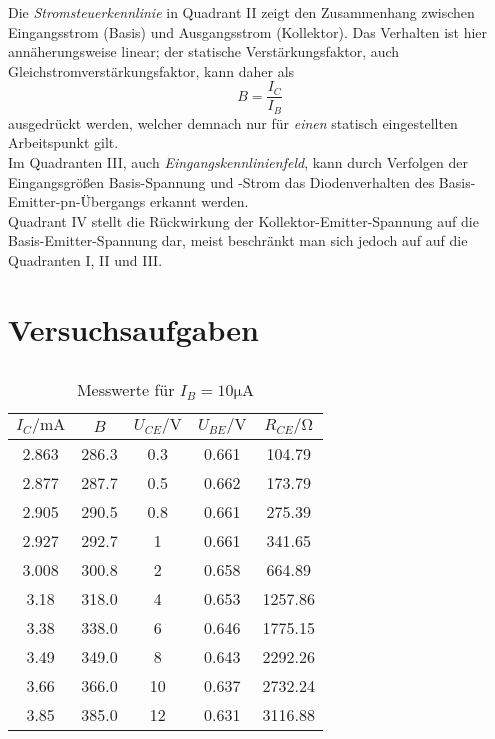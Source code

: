 \documentclass[a4paper, 12pt]{article}
\begin{document}
Die \emph{Stromsteuerkennlinie} in Quadrant II zeigt den Zusammenhang
zwischen Eingangsstrom (Basis) und Ausgangsstrom (Kollektor). Das
Verhalten ist hier annäherungsweise linear; der statische Verstärkungsfaktor,
auch Gleichstromverstärkungsfaktor, kann daher als
$$B = \frac{I_C}{I_B}$$
ausgedrückt werden, welcher demnach nur für \textit{einen} statisch
eingestellten Arbeitspunkt gilt. \\ 

Im Quadranten III, auch \emph{Eingangskennlinienfeld}, kann durch Verfolgen der Eingangsgrößen Basis-Spannung und -Strom das
Diodenverhalten des Basis-Emitter-pn-Übergangs erkannt werden.\\

Quadrant IV stellt die Rückwirkung der Kollektor-Emitter-Spannung auf
die Basis-Emitter-Spannung dar, meist beschränkt man sich jedoch auf
auf die Quadranten I, II und III.


\pagebreak

  \clearpage
\setcounter{page}{1}

\setcounter{section}{0}
\section{Versuchsaufgaben}

\subsection{}

\begin{table}[H]
  \begin{center}
\begin{tabular}{@{}ccccc@{}}
\toprule
$I_C / \si{\milli\ampere}$ & $B$                & $U_{CE} / \si{\volt}$ & $U_{BE} / \si{\volt}$ & $R_{CE} / \si{\ohm}$           \\ \midrule
2.863 & 286.3              & 0.3      & 0.661    & 104.79\\
2.877 & 287.7              & 0.5      & 0.662    & 173.79\\
2.905 & 290.5 & 0.8      & 0.661    & 275.39\\
2.927 & 292.7 & 1        & 0.661    & 341.65\\
3.008 & 300.8& 2        & 0.658    & 664.89\\
3.18  & 318.0& 4        & 0.653    & 1257.86\\
3.38  & 338.0                & 6        & 0.646    & 1775.15\\
3.49  & 349.0& 8        & 0.643    & 2292.26\\
3.66  & 366.0& 10       & 0.637    & 2732.24\\
3.85  & 385.0& 12       & 0.631    & 3116.88\\ \bottomrule
\end{tabular}
\end{center}
\caption{Messwerte für $I_B = 10 \si{\micro\ampere}$}
\end{table}
\end{document}
